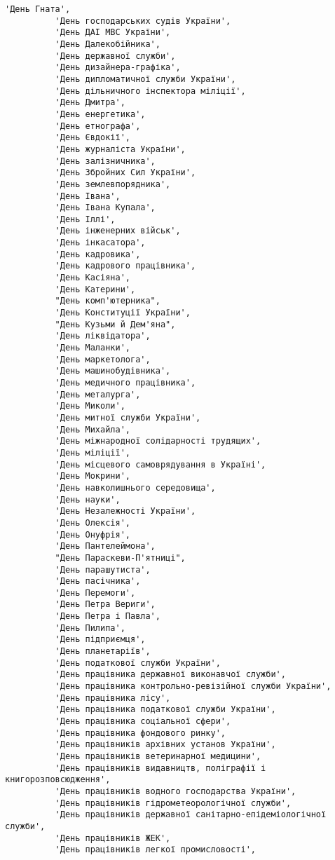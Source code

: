 \documentclass[11pt]{article}
\begin{document}
\begin{Verbatim}[commandchars=\\\{\}]
          'День Гната',
          'День господарських судів України',
          'День ДАІ МВС України',
          'День Далекобійника',
          'День державної служби',
          'День дизайнера-графіка',
          'День дипломатичної служби України',
          'День дільничного інспектора міліції',
          'День Дмитра',
          'День енергетика',
          'День етнографа',
          'День Євдокії',
          'День журналіста України',
          'День залізничника',
          'День Збройних Сил України',
          'День землевпорядника',
          'День Івана',
          'День Івана Купала',
          'День Іллі',
          'День інженерних військ',
          'День інкасатора',
          'День кадровика',
          'День кадрового працівника',
          'День Касіяна',
          'День Катерини',
          "День комп'ютерника",
          'День Конституції України',
          "День Кузьми й Дем'яна",
          'День ліквідатора',
          'День Маланки',
          'День маркетолога',
          'День машинобудівника',
          'День медичного працівника',
          'День металурга',
          'День Миколи',
          'День митної служби України',
          'День Михайла',
          'День міжнародної солідарності трудящих',
          'День міліції',
          'День місцевого самоврядування в Україні',
          'День Мокрини',
          'День навколишнього середовища',
          'День науки',
          'День Незалежності України',
          'День Олексія',
          'День Онуфрія',
          'День Пантелеймона',
          "День Параскеви-П'ятниці",
          'День парашутиста',
          'День пасічника',
          'День Перемоги',
          'День Петра Вериги',
          'День Петра і Павла',
          'День Пилипа',
          'День підприємця',
          'День планетаріїв',
          'День податкової служби України',
          'День працівника державної виконавчої служби',
          'День працівника контрольно-ревізійної служби України',
          'День працівника лісу',
          'День працівника податкової служби України',
          'День працівника соціальної сфери',
          'День працівника фондового ринку',
          'День працівників архівних установ України',
          'День працівників ветеринарної медицини',
          'День працівників видавництв, поліграфії і книгорозповсюдження',
          'День працівників водного господарства України',
          'День працівників гідрометеорологічної служби',
          'День працівників державної санітарно-епідеміологічної служби',
          'День працівників ЖЕК',
          'День працівників легкої промисловості',

\end{Verbatim}
\end{document}
